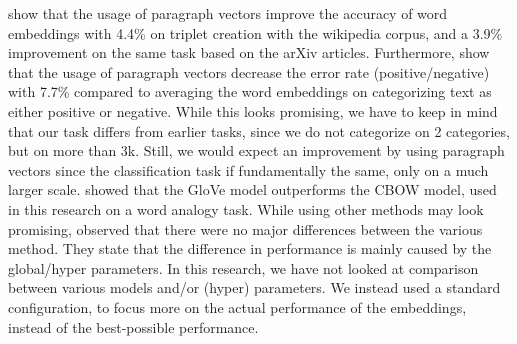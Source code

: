 \documentclass[../../Thesis.tex]{subfiles}
\begin{document}
\citet{dai2015document} show that the usage of paragraph vectors improve the accuracy of word embeddings with 4.4\% on triplet creation with the wikipedia corpus, and a 3.9\% improvement on the same task based on the arXiv articles. Furthermore, \citet{le2014distributed} show that the usage of paragraph vectors decrease the error rate (positive/negative) with 7.7\% compared to averaging the word embeddings on categorizing text as either positive or negative. While this looks promising, we have to keep in mind that our task differs from earlier tasks, since we do not categorize on 2 categories, but on more than 3k. Still, we would expect an improvement by using paragraph vectors since the classification task if fundamentally the same, only on a much larger scale. \citet{pennington2014glove} showed that the GloVe model  outperforms the CBOW model, used in this research on a word analogy task. While using other methods may look promising, \citet{levy2015improving} observed that there were no major differences between the various method. They state that the difference in performance is mainly caused by the global/hyper parameters. In this research,  we have not looked at comparison between various models and/or (hyper) parameters. We instead used a standard configuration, to focus more on the actual performance of the embeddings, instead of the best-possible performance.
\end{document}
